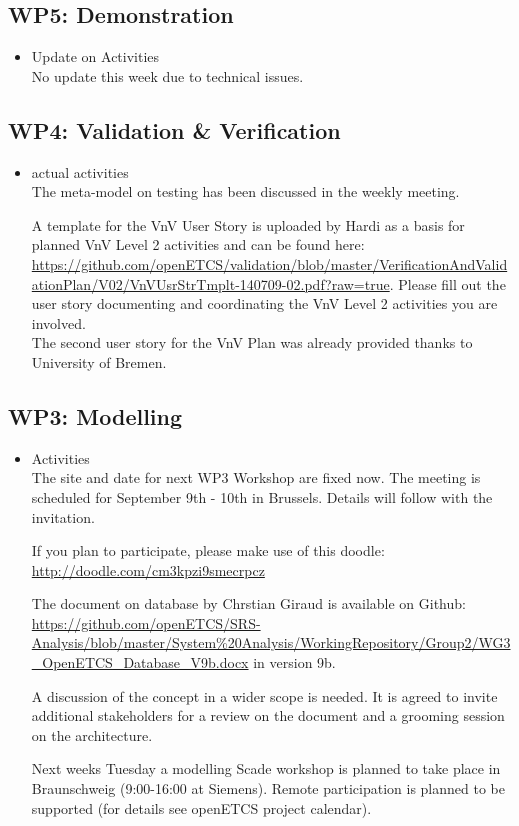\documentclass[a4paper, 11pt]{article}
\begin{document}
\subsection{WP5: Demonstration}
\begin{itemize}
\item Update on Activities\\

No update this week due to technical issues.

\end{itemize}


\subsection{WP4: Validation \& Verification}
\begin{itemize}
\item actual activities\\
The meta-model on testing has been discussed in the weekly meeting. 

A template for the VnV User Story is uploaded by Hardi as a basis for planned VnV Level 2 activities and can be found here: \url{https://github.com/openETCS/validation/blob/master/VerificationAndValidationPlan/V02/VnVUsrStrTmplt-140709-02.pdf?raw=true}. Please fill out the user story documenting and coordinating the VnV Level 2 activities you are involved.\\
The second user story for the VnV Plan was already provided thanks to University of Bremen.
 
\end{itemize}

\subsection{WP3: Modelling}

\begin{itemize}
\item Activities\\

The site and date for next WP3 Workshop are fixed now. The meeting is scheduled for September 9th - 10th in Brussels. Details will follow with the invitation.

If you plan to participate, please make use of this doodle: \url{http://doodle.com/cm3kpzi9smecrpcz}

The document on database by Chrstian Giraud is available on Github: \url{https://github.com/openETCS/SRS-Analysis/blob/master/System%20Analysis/WorkingRepository/Group2/WG3_OpenETCS_Database_V9b.docx} in version 9b.

A discussion of the concept in a wider scope is needed. It is agreed to invite additional stakeholders for a review on the document and a grooming session on the architecture.

Next weeks Tuesday a modelling Scade workshop is planned to take place in Braunschweig (9:00-16:00 at Siemens). Remote participation is planned to be supported (for details see openETCS project calendar).

\end{itemize}
\end{document}
